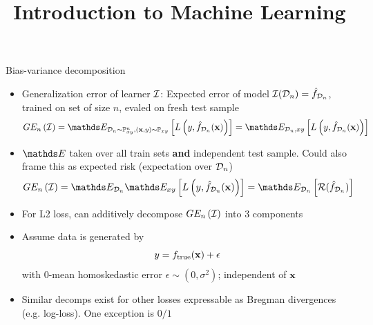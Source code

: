 \documentclass[11pt,compress,t,notes=noshow, xcolor=table]{beamer}
\title{Introduction to Machine Learning}
\begin{document}
    

\begin{vbframe} {Bias-variance decomposition}

\begin{itemize} 
\item Generalization error of learner  $\mathcal{I}$: 
Expected error of model $\mathcal{I}(\mathcal{D}_n) = \hat{f}_{\mathcal{D}_n}$, trained on set of size $n$, evaled on fresh test sample
$$
GE_n\left(\ind\right) = \E_{\D_n \sim \Pxy^n, (\xv, y) \sim \Pxy}\left[ L\left(y, \fh_{\D_n}(\xv)\right) \right] = \E_{\D_n, xy}\left[L\left(y, \fh_{\D_n}(\xv)\right) \right]  
$$

\item $\E$ taken over all train sets \textbf{and} independent test sample. Could also frame this as expected risk (expectation over $\mathcal{D}_n$)
$$GE_n\left(\ind\right) = \E_{\D_n}\E_{xy}\left[ L\left(y, \fh_{\D_n}(\xv)\right)\right] =  \E_{\D_n}\left[\risk(\fh_{\D_n})\right]$$

\item For L2 loss, can additively decompose  $GE_n\left(\mathcal{I}\right)$ into 3 components

\item Assume data is generated by 
$$
y = f_{\text{true}}(\mathbf{x}) + \epsilon
$$
with 0-mean homoskedastic error $\epsilon \sim (0, \sigma^2)$; independent of $\mathbf{x}$

\item Similar decomps exist for other losses expressable as Bregman divergences (e.g. log-loss). One exception is $0/1$ 

\end{itemize} 

\end{vbframe}
\end{document}
